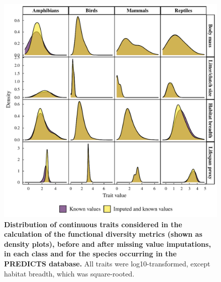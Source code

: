 \begin{figure}[h!]
\centering
\includegraphics[scale=0.8]{Supporting/Chapter3/Figures/SI_dist_cont}
\caption[Distribution of continuous traits considered in the calculation of the functional diversity metrics]{\textbf{Distribution of continuous traits considered in the calculation of the functional diversity metrics (shown as density plots), before and after missing value imputations, in each class and for the species occurring in the PREDICTS database.} All traits were log10-transformed, except habitat breadth, which was square-rooted.}
\label{SI3_F6}
\end{figure}

